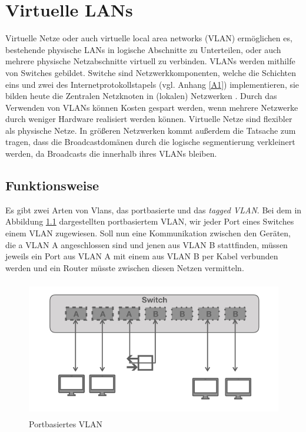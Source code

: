 \chapter{Virtuelle LANs}

Virtuelle Netze oder auch virtuelle local area networks (VLAN) ermöglichen es, bestehende physische LANs in logische Abschnitte zu Unterteilen, oder auch mehrere physische Netzabschnitte virtuell zu verbinden. VLANs werden mithilfe von Switches gebildet. Switche sind Netzwerkkomponenten, welche die Schichten eins und zwei des Internetprotokollstapels (vgl. Anhang \ref{A1}) implementieren, sie bilden heute die Zentralen Netzknoten in (lokalen) Netzwerken \cite{zisler2018computer}. 
Durch das Verwenden von VLANs können Kosten gespart werden, wenn mehrere Netzwerke durch weniger  Hardware realisiert werden können. Virtuelle Netze sind flexibler als physische Netze. In größeren Netzwerken kommt außerdem die Tatsache zum tragen, dass die Broadcastdomänen durch die logische segmentierung verkleinert werden, da Broadcasts die innerhalb ihres VLANs bleiben.


\section{Funktionsweise}


Es gibt zwei Arten von Vlans, das portbasierte und das \emph{tagged VLAN}. 
Bei dem in Abbildung \ref{vlanport} dargestellten portbasiertem VLAN, wir jeder Port eines Switches einem VLAN zugewiesen. Soll nun eine Kommunikation zwischen den Geräten, die a VLAN A angeschlossen sind und jenen aus VLAN B stattfinden, müssen jeweils ein Port aus VLAN A mit einem aus VLAN B per Kabel verbunden werden und ein Router müsste zwischen diesen Netzen vermitteln\cite{cisco14rout}.  


\begin{figure}[h]
\centering
	\includegraphics[width=0.8\linewidth, height= 6cm]{vlan.001.jpeg}
	\caption{Portbasiertes VLAN}
	\label{vlanport}
\end{figure}


